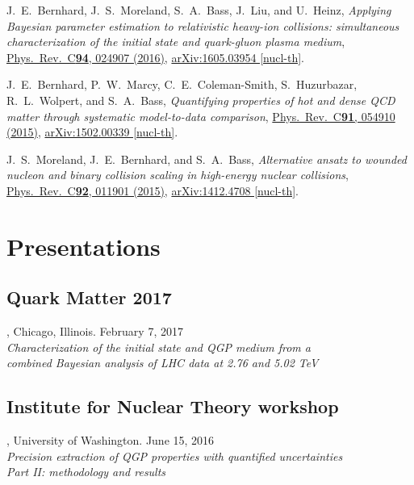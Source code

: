 \documentclass[letterpaper,10pt]{article}
\begin{document}
J.~E.~Bernhard, J.~S.~Moreland, S.~A.~Bass, J.~Liu, and U.~Heinz,
\emph{Applying Bayesian parameter estimation to relativistic heavy-ion collisions: simultaneous characterization of the initial state and quark-gluon plasma medium},
\href{https://journals.aps.org/prc/abstract/10.1103/PhysRevC.94.024907}{Phys.\ Rev.\ C{\bf 94}, 024907 (2016)},
\href{https://arxiv.org/abs/1605.03954}{arXiv:1605.03954 [nucl-th]}.

\vspace{1em}

J.~E.~Bernhard, P.~W.~Marcy, C.~E.~Coleman-Smith, S.~Huzurbazar, R.~L.~Wolpert, and S.~A.~Bass,
\emph{Quantifying properties of hot and dense QCD matter through systematic model-to-data comparison},
\href{https://journals.aps.org/prc/abstract/10.1103/PhysRevC.91.054910}{Phys.\ Rev.\ C{\bf 91}, 054910 (2015)},
\href{https://arxiv.org/abs/1502.00339}{arXiv:1502.00339 [nucl-th]}.

\vspace{1em}

J.~S.~Moreland, J.~E.~Bernhard, and S.~A.~Bass,
\emph{Alternative ansatz to wounded nucleon and binary collision scaling in high-energy nuclear collisions},
\href{https://journals.aps.org/prc/abstract/10.1103/PhysRevC.92.011901}{Phys.\ Rev.\ C{\bf 92}, 011901 (2015)},
\href{https://arxiv.org/abs/1412.4708}{arXiv:1412.4708 [nucl-th]}.



\section{Presentations}


\subsection{Quark Matter 2017}, Chicago, Illinois. \hfill February 7, 2017 \\
\emph{Characterization of the initial state and QGP medium from a \\ combined Bayesian analysis of LHC data at 2.76 and 5.02 TeV}

\subsection{Institute for Nuclear Theory workshop}, University of Washington. \hfill June 15, 2016 \\
\emph{Precision extraction of QGP properties with quantified uncertainties \\ Part II: methodology and results}
\end{document}
